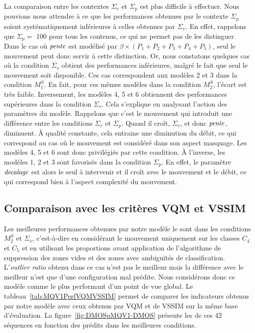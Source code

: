 La comparaison entre les contextes $\Sigma_v$ et $\Sigma_p$ est plus difficile à effectuer. Nous pouvions nous attendre à ce que les performances obtenues par le contexte $\Sigma_p$ soient systématiquement inférieures à celles obtenues par $\Sigma_v$. En effet, rappelons que $\Sigma_p = $ 100 pour tous les contenus, ce qui ne permet pas de les distinguer. Dans le cas où $\mathit{pente}$ est modélisé par $\beta \times (P_1 + P_2 + P_3 + P_4 + P_5)$, seul le mouvement peut donc servir à cette distinction. Or, nous constatons quelques cas où la condition $\Sigma_v$ obtient des performances inférieures, malgré le fait que seul le mouvement soit disponible. Ces cas correspondent aux modèles 2 et 3 dans la condition $M^S_1$. En fait, pour ces mêmes modèles dans la condition $M^S_2$, l'écart est très faible. Inversement, les modèles 4, 5 et 6 obtiennent des performances supérieures dans la condition $\Sigma_v$. Cela s'explique en analysant l'action des paramètres du modèle. Rappelons que c'est le mouvement qui introduit une différence entre les conditions $\Sigma_v$ et $\Sigma_p$. Quand il croît, $\Sigma_v$, et donc $\mathit{pente}$, diminuent. À qualité constante, cela entraine une diminution du débit, ce qui correspond au cas où le mouvement est considéré dans son aspect masquage. Les modèles 4, 5 et 6 sont donc privilégiés par cette condition. À l'inverse, les modèles 1, 2 et 3 sont favorisés dans la condition $\Sigma_p$. En effet, le paramètre $\mathit{decalage}$ est alors le seul à intervenir et il croît avec le mouvement et le débit, ce qui correspond bien à l'aspect complexité du mouvement.


\subsection{Comparaison avec les critères VQM et VSSIM}
Les meilleures performances obtenues par notre modèle le sont dans les conditions $M^S_2$ et $\Sigma_v$, c'est-à-dire en considérant le mouvement uniquement sur les classes $C_4$ et $C_5$ et en utilisant les proportions avant application de l'algorithme de suppression des zones vides et des zones avec ambiguïtés de classification. L'\emph{outlier ratio} obtenu dans ce cas n'est pas le meilleur mais la différence avec le meilleur n'est que d'une configuration mal prédite. Nous considérons donc ce modèle comme le plus performant d'un point de vue global. Le tableau~\ref{tab:MQV1PerfVQMVSSIM} permet de comparer les indicateurs obtenus par notre modèle avec ceux obtenus par VQM et de VSSIM sur la même base d'évaluation. La figure~\ref{fig:DMOSpMQV1-DMOS} présente les \Dcent{} de ces 42 séquences en fonction des \Dcent{} prédits dans les meilleures conditions.

